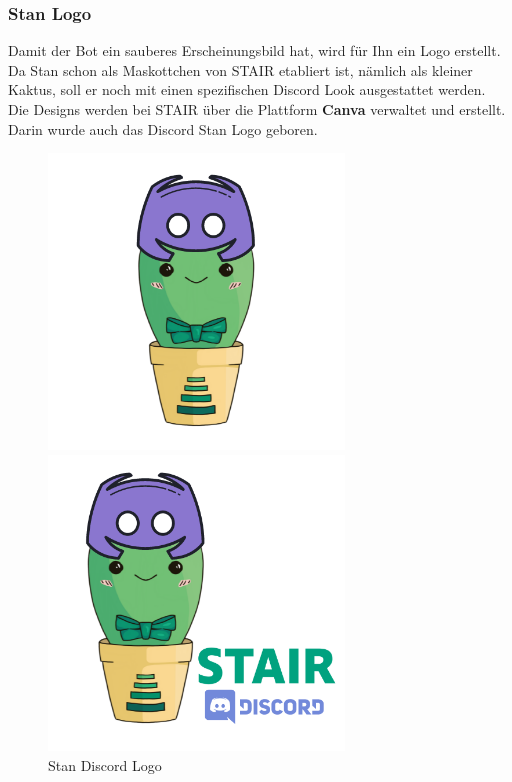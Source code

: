 \documentclass[a4paper, table]{article}
\begin{document}
\subsubsection{Stan Logo}
Damit der Bot ein sauberes Erscheinungsbild hat, wird für Ihn ein Logo erstellt.
Da Stan schon als Maskottchen von STAIR etabliert ist, nämlich als kleiner Kaktus, 
soll er noch mit einen spezifischen Discord Look ausgestattet werden.\\
Die Designs werden bei STAIR über die Plattform \textbf{Canva} verwaltet und erstellt. \autocite{noauthor_kostenloses_nodate}
Darin wurde auch das Discord Stan Logo geboren.

\begin{figure}[h]
    \begin{minipage}[t]{0.5\textwidth}
        \includegraphics[width=0.7\textwidth]{img/StanDiscordLogoSolo.png}
    \end{minipage}
    \begin{minipage}[t]{0.5\textwidth}
        \includegraphics[width=0.7\textwidth]{img/StanDiscordLogo.png}
    \end{minipage}
    \caption{Stan Discord Logo}
    \label{fig:stan-discord-logo}
\end{figure}
\end{document}
